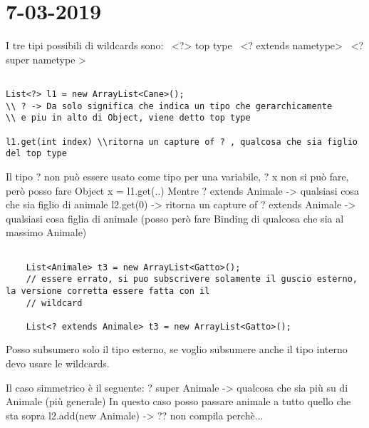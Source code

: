 

\newpage
\section{7-03-2019}
I tre tipi possibili di wildcards sono: \newline
\textbullet\ <?> top type \newline
\textbullet\ <? extends nametype> \newline
\textbullet\ <? super nametype > \newline



\begin{lstlisting}[basicstyle=\small,]

List<?> l1 = new ArrayList<Cane>();
\\ ? -> Da solo significa che indica un tipo che gerarchicamente
\\ e piu in alto di Object, viene detto top type

l1.get(int index) \\ritorna un capture of ? , qualcosa che sia figlio del top type 

\end{lstlisting}

\noindent Il tipo ? non può essere usato come tipo per una variabile, ? x non si può fare, però posso fare
Object x = l1.get(..) \newline
Mentre ? extends Animale -> qualsiasi cosa che sia figlio di animale \newline
l2.get(0) -> ritorna un capture of ? extends Animale -> qualsiasi cosa figlia di animale (posso però fare Binding di qualcosa che sia al massimo Animale) \newline

\begin{lstlisting}[basicstyle=\small,]

	List<Animale> t3 = new ArrayList<Gatto>();
	// essere errato, si puo subscrivere solamente il guscio esterno, la versione corretta essere fatta con il 
	// wildcard
	
	List<? extends Animale> t3 = new ArrayList<Gatto>();

\end{lstlisting}

\noindent Posso subsumero solo il tipo esterno, se voglio subsumere anche il tipo interno devo usare le wildcards. \newline

\noindent Il caso simmetrico è il seguente: \newline
? super Animale -> qualcosa che sia più su di Animale (più generale) \newline
In questo caso posso passare animale a tutto quello che sta sopra
l2.add(new Animale) -> ?? non compila perchè... \newline





